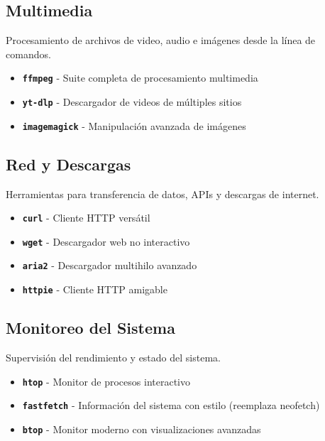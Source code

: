 \documentclass[
  11pt,
  letterpaper,
  oneside,
  openany]{scrbook}
\providecommand{\tightlist}{%
  \setlength{\itemsep}{0pt}\setlength{\parskip}{0pt}}
\begin{document}
\subsection*{Multimedia}\label{multimedia}

Procesamiento de archivos de video, audio e imágenes desde la línea de
comandos.

\begin{itemize}
\tightlist
\item
  \textbf{\texttt{ffmpeg}} - Suite completa de procesamiento multimedia
\item
  \textbf{\texttt{yt-dlp}} - Descargador de videos de múltiples sitios\\
\item
  \textbf{\texttt{imagemagick}} - Manipulación avanzada de imágenes
\end{itemize}

\subsection*{Red y Descargas}\label{red-y-descargas}

Herramientas para transferencia de datos, APIs y descargas de internet.

\begin{itemize}
\tightlist
\item
  \textbf{\texttt{curl}} - Cliente HTTP versátil
\item
  \textbf{\texttt{wget}} - Descargador web no interactivo
\item
  \textbf{\texttt{aria2}} - Descargador multihilo avanzado
\item
  \textbf{\texttt{httpie}} - Cliente HTTP amigable
\end{itemize}

\subsection*{Monitoreo del Sistema}\label{monitoreo-del-sistema}

Supervisión del rendimiento y estado del sistema.

\begin{itemize}
\tightlist
\item
  \textbf{\texttt{htop}} - Monitor de procesos interactivo
\item
  \textbf{\texttt{fastfetch}} - Información del sistema con estilo
  (reemplaza neofetch)
\item
  \textbf{\texttt{btop}} - Monitor moderno con visualizaciones avanzadas
\end{itemize}
\end{document}
